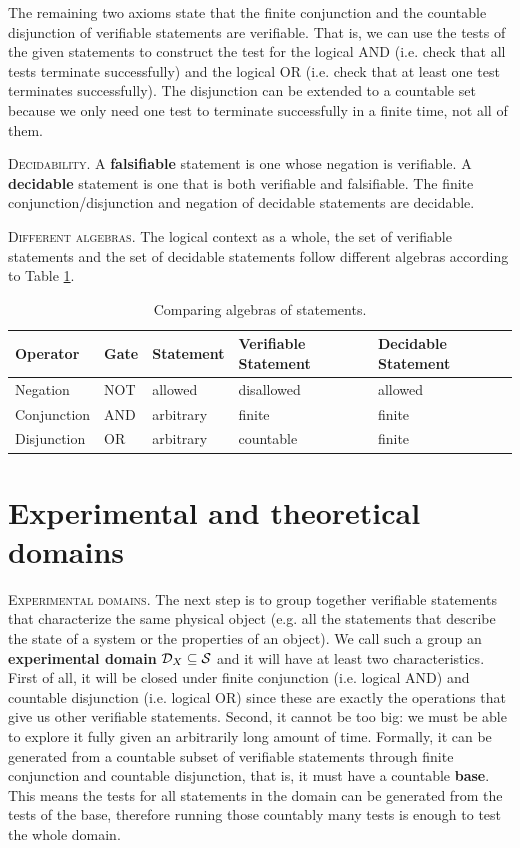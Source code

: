 \documentclass[10pt,twocolumn, nofootinbib]{revtex4-1}
\newcommand\partitle[1]{\textsc{#1}.}
\begin{document}
The remaining two axioms state that the finite conjunction and the countable disjunction of verifiable statements are verifiable. That is, we can use the tests of the given statements to construct the test for the logical AND (i.e. check that all tests terminate successfully) and the logical OR (i.e. check that at least one test terminates successfully). The disjunction can be extended to a countable set because we only need one test to terminate successfully in a finite time, not all of them.

\partitle{Decidability} A \textbf{falsifiable} statement is one whose negation is verifiable. A \textbf{decidable} statement is one that is both verifiable and falsifiable. The finite conjunction/disjunction and negation of decidable statements are decidable.

\partitle{Different algebras} The logical context as a whole, the set of verifiable statements and the set of decidable statements follow different algebras according to Table \ref{algebras}.

\begin{table}[h]
	\centering
	\begin{tabular}{p{} p{} p{} p{} p{}}
		Operator & Gate & Statement & Verifiable Statement & Decidable Statement  \\ 
		\hline 
		Negation & NOT & allowed & disallowed & allowed \\ 
		Conjunction & AND & arbitrary  & finite & finite \\ 
		Disjunction & OR & arbitrary  & countable & finite \\ 
	\end{tabular}
	\caption{Comparing algebras of statements.}
	\label{algebras}
\end{table}


\section{Experimental and theoretical domains}

\partitle{Experimental domains} The next step is to group together verifiable statements that characterize the same physical object (e.g. all the statements that describe the state of a system or the properties of an object). We call such a group an \textbf{experimental domain} $\mathcal{D}_X \subseteq \mathcal{S}$ and it will have at least two characteristics. First of all, it will be closed under finite conjunction (i.e. logical AND) and countable disjunction (i.e. logical OR) since these are exactly the operations that give us other verifiable statements. Second, it cannot be too big: we must be able to explore it fully given an arbitrarily long amount of time. Formally, it can be generated from a countable subset of verifiable statements through finite conjunction and countable disjunction, that is, it must have a countable \textbf{base}. This means the tests for all statements in the domain can be generated from the tests of the base, therefore running those countably many tests is enough to test the whole domain.
\end{document}
